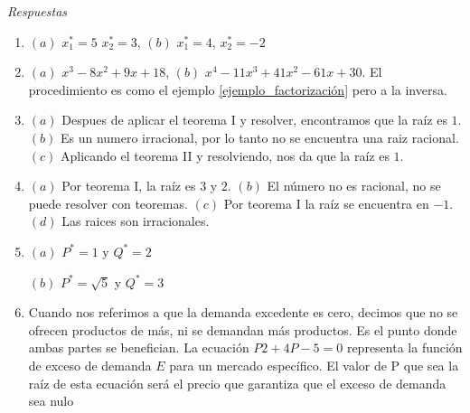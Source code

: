 \begin{ejercicio}
\begin{enumerate}
    \end{enumerate}
    \emph{Respuestas}
    \begin{enumerate}
        \item \((a)\) \(x_1^*=5\) \(x_2^*=3\), \((b)\) \(x_1^*=4\), \(x_2^*=-2\)
        \item \((a)\) \(x^3-8x^2+9x+18\), \((b)\) \(x^4-11x^3+41x^2-61x+30\). El procedimiento es como el ejemplo \ref{ejemplo_factorización} pero a la inversa.
        \item \((a)\) Despues de aplicar el teorema I y resolver, encontramos que la raíz es \(1\). \((b)\) Es un numero irracional, por lo tanto no se encuentra una raiz racional. \((c)\) Aplicando el teorema II y resolviendo, nos da que la raíz es \(1\).
        \item \((a)\) Por teorema I, la raíz es \(3\) y \(2\). \((b)\) El número no es racional, no se puede resolver con teoremas. \((c)\) Por teorema I la raíz se encuentra en \(-1\). \((d)\) Las raices son irracionales.
        \item \((a)\) \(P^*=1\) y \(Q^*=2\) 
        
        \((b)\) \(P^*=\sqrt{5}\) y \(Q^*=3\)
        \item Cuando nos referimos a que la demanda excedente es cero, decimos que no se ofrecen productos de más, ni se demandan más productos. Es el punto donde ambas partes se benefician. La ecuación \(P2+4P-5=0\) representa la función de exceso de demanda \(E\) para un mercado específico. El valor de P que sea la raíz de esta ecuación será el precio que garantiza que el exceso de demanda sea nulo
    \end{enumerate}
\end{ejercicio}

